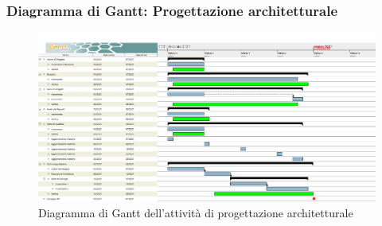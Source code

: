 \subsubsection{Diagramma di Gantt: Progettazione architetturale}
\begin{figure}[ht]
    \centering
    \includegraphics[width=\textwidth]{Immagini/GanttProgettazioneArchitetturale}
    \caption{Diagramma di Gantt dell'attività di progettazione architetturale}
\end{figure}